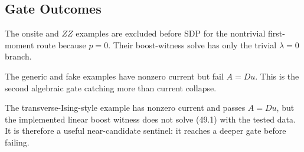 \subsection{Gate Outcomes}

The onsite and \(ZZ\) examples are excluded before SDP for the nontrivial
first-moment route because \(p=0\).  Their boost-witness solve has only the
trivial \(\lambda=0\) branch.

The generic and fake examples have nonzero current but fail \(A=Du\).  This is
the second algebraic gate catching more than current collapse.

The transverse-Ising-style example has nonzero current and passes \(A=Du\), but
the implemented linear boost witness does not solve (49.1) with the tested
data.  It is therefore a useful near-candidate sentinel: it reaches a deeper
gate before failing.

